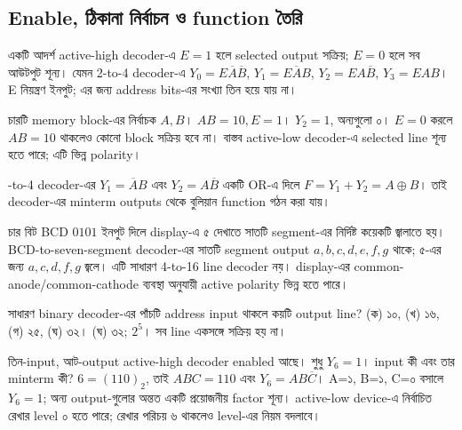 \subsection{Enable, ঠিকানা নির্বাচন ও function তৈরি}
একটি আদর্শ active-high decoder-এ $E=1$ হলে selected output সক্রিয়; $E=0$ হলে সব আউটপুট শূন্য। যেমন 2-to-4 decoder-এ $Y_0=E\overline A\overline B$, $Y_1=E\overline AB$, $Y_2=EA\overline B$, $Y_3=EAB$। E নিয়ন্ত্রণ ইনপুট; এর জন্য address bits-এর সংখ্যা তিন হয়ে যায় না।

চারটি memory block-এর নির্বাচক $A,B$। $AB=10,E=1$।
\chThreeAnswer $Y_2=1$, অন্যগুলো ০। $E=0$ করলে $AB=10$ থাকলেও কোনো block সক্রিয় হবে না। বাস্তব active-low decoder-এ selected line শূন্য হতে পারে; এটি ভিন্ন polarity।

-to-4 decoder-এর $Y_1=\overline AB$ এবং $Y_2=A\overline B$ একটি OR-এ দিলে $F=Y_1+Y_2=A\oplus B$। তাই decoder-এর minterm outputs থেকে বুলিয়ান function গঠন করা যায়।

চার বিট BCD $0101$ ইনপুট দিলে display-এ ৫ দেখাতে সাতটি segment-এর নির্দিষ্ট কয়েকটি জ্বালাতে হয়।
\chThreeAnswer BCD-to-seven-segment decoder-এর সাতটি segment output $a,b,c,d,e,f,g$ থাকে; ৫-এর জন্য $a,c,d,f,g$ জ্বলে। এটি সাধারণ 4-to-16 line decoder নয়। display-এর common-anode/common-cathode ব্যবস্থা অনুযায়ী active polarity ভিন্ন হতে পারে।

সাধারণ binary decoder-এর পাঁচটি address input থাকলে কয়টি output line? (ক) ১০, (খ) ১৬, (গ) ২৫, (ঘ) ৩২।
\chThreeAnswer (ঘ) ৩২; $2^5$। সব line একসঙ্গে সক্রিয় হয় না।

তিন-input, আট-output active-high decoder enabled আছে। শুধু $Y_6=1$। input কী এবং তার minterm কী?
\chThreeAnswer $6=(110)_2$, তাই $ABC=110$ এবং $Y_6=AB\overline C$। A=১, B=১, C=০ বসালে $Y_6=1$; অন্য output-গুলোর অন্তত একটি প্রয়োজনীয় factor শূন্য। active-low device-এ নির্বাচিত রেখার level ০ হতে পারে; রেখার পরিচয় ৬ থাকলেও level-এর নিয়ম বদলাবে।
